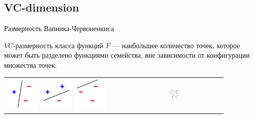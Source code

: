 \documentclass[14pt, fleqn, xcolor={dvipsnames, table}]{beamer}
\begin{document}
\subsection{VC-dimension}
\begin{frame}{Размерность Вапника-Червоненкиса}
\begin{definition}
$VC$-размерность класса функций $F$ --- наибольшее количество точек, которое может быть разделено функциями семейства, вне зависимости от конфигурации множества точек.
\end{definition}
\begin{tabular}{p{}p{}}
\colorbox{green!10}{
\includegraphics[width=0.20\textwidth]{100px-VC1.png}\hspace{2px}
\includegraphics[width=0.20\textwidth]{100px-VC2.png}\hspace{2px}
\includegraphics[width=0.20\textwidth]{100px-VC3.png}\hspace{1px}
} & \colorbox{red!10}{
\includegraphics[width=0.20\textwidth]{100px-VC4.png}\hspace{1px}
} \\
\end{tabular}
\end{frame}
\end{document}
